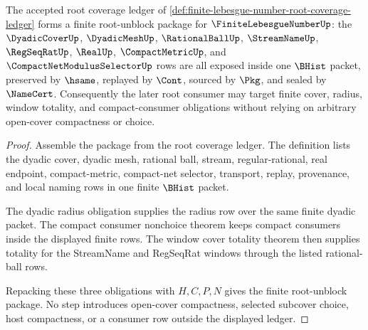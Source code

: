 \begin{theorem}
\label{thm:finite-lebesgue-number-root-unblock-package}
The accepted root coverage ledger of \autoref{def:finite-lebesgue-number-root-coverage-ledger} forms a finite root-unblock package for $\FiniteLebesgueNumberUp$: the $\DyadicCoverUp$, $\DyadicMeshUp$, $\RationalBallUp$, $\StreamNameUp$, $\RegSeqRatUp$, $\RealUp$, $\CompactMetricUp$, and $\CompactNetModulusSelectorUp$ rows are all exposed inside one $\BHist$ packet, preserved by $\hsame$, replayed by $\Cont$, sourced by $\Pkg$, and sealed by $\NameCert$. Consequently the later root consumer may target finite cover, radius, window totality, and compact-consumer obligations without relying on arbitrary open-cover compactness or choice.
\end{theorem}
\begin{proof}
Assemble the package from the root coverage ledger. The definition lists the dyadic cover, dyadic mesh, rational ball, stream, regular-rational, real endpoint, compact-metric, compact-net selector, transport, replay, provenance, and local naming rows in one finite $\BHist$ packet.

The dyadic radius obligation supplies the radius row over the same finite dyadic packet. The compact consumer nonchoice theorem keeps compact consumers inside the displayed finite rows. The window cover totality theorem then supplies totality for the StreamName and RegSeqRat windows through the listed rational-ball rows.

Repacking these three obligations with $H,C,P,N$ gives the finite root-unblock package. No step introduces open-cover compactness, selected subcover choice, host compactness, or a consumer row outside the displayed ledger.
\end{proof}

